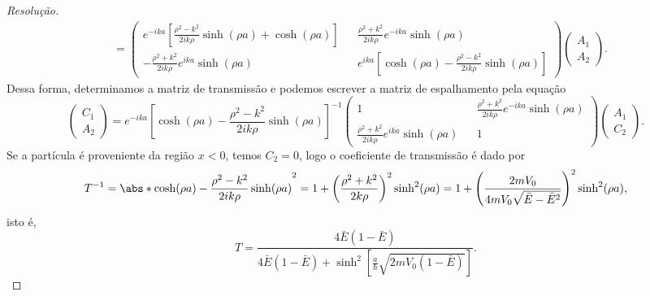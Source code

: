 \begin{proof}[Resolução]
\begin{align*}
        &= \begin{pmatrix}
            e^{-ika}\left[\frac{\rho^2 - k^2}{2i k \rho}\sinh(\rho a) + \cosh(\rho a)\right] && \frac{\rho^2 + k^2}{2ik\rho}e^{-ika}\sinh(\rho a)\\
            -\frac{\rho^2 + k^2}{2ik\rho} e^{ika} \sinh(\rho a) &&e^{ika}\left[\cosh(\rho a)-\frac{\rho^2 - k^2}{2i k \rho}\sinh(\rho a)\right]
        \end{pmatrix}
        \begin{pmatrix}
            A_1\\
            A_2
        \end{pmatrix}.
    \end{align*}
    Dessa forma, determinamos a matriz de transmissão e podemos escrever a matriz de espalhamento pela equação
    \begin{equation*}
        \begin{pmatrix}
            C_1 \\
            A_2
        \end{pmatrix} =
        e^{-ika}\left[\cosh(\rho a)-\frac{\rho^2 - k^2}{2i k \rho}\sinh(\rho a)\right]^{-1}
        \begin{pmatrix}
            1 && \frac{\rho^2 + k^2}{2ik\rho}e^{-ika}\sinh(\rho a)\\
            \frac{\rho^2 + k^2}{2ik\rho} e^{ika} \sinh(\rho a) && 1
        \end{pmatrix}
        \begin{pmatrix}
            A_1 \\
            C_2
        \end{pmatrix}.
    \end{equation*}
    Se a partícula é proveniente da região \(x < 0\), temos \(C_2 = 0\), logo o coeficiente de transmissão é dado por
    \begin{equation*}
        T^{-1} = \abs*{\cosh(\rho a) - \frac{\rho^2 - k^2}{2ik\rho}\sinh(\rho a)}^2 = 1 + \left(\frac{\rho^2 + k^2}{2k\rho}\right)^2 \sinh^2(\rho a) = 1 + \left(\frac{2m V_0}{4mV_0 \sqrt{\bar{E} - \bar{E}^2}}\right)^2\sinh^2(\rho a),
    \end{equation*}
    isto é,
    \begin{equation*}
        T = \frac{4\bar{E}(1 - \bar{E})}{4\bar{E} (1 - \bar{E}) + \sinh^2\left[\frac{a}{\hbar}\sqrt{2mV_0(1 - \bar{E})}\right]}.
    \end{equation*}
\end{proof}
